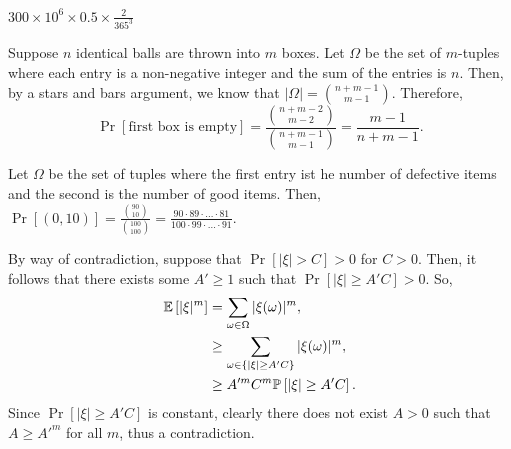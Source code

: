 \begin{problem}{1}
\end{problem}
\begin{solution} 
    $300\times {10}^{6} \times 0.5 \times \frac{2}{365^3}$
\end{solution}
\begin{problem}{2}
\end{problem}
\begin{solution}
    Suppose $n$ identical balls are thrown into $m$ boxes. Let $\Omega$ be the
    set of $m$-tuples where each entry is a non-negative integer and the sum of
    the entries is $n$. Then, by a stars and bars argument, we know that
    $|\Omega| = \binom{n+m-1}{m-1}$. Therefore, 
    \[
      \Pr\left[{\text{first box is empty}}\right] = \frac{\binom{n+m-2}{m-2}}{\binom{n+m-1}{m-1}} = \frac{m-1}{n+m-1}.
    \]
\end{solution}
\begin{problem}{3} 
\end{problem}
\begin{solution}
    Let $\Omega$ be the set of tuples where the first entry ist he number of
    defective items and the second is the number of good items. Then,
    $\Pr\left[{(0,10)}\right] = \frac{\binom{90}{10}}{\binom{100}{100}} =
    \frac{90\cdot 89 \cdot \ldots \cdot 81}{100 \cdot 99 \cdot \ldots \cdot
    91}$.
\end{solution}
\begin{problem}{4}
\end{problem}
\begin{solution}
    By way of contradiction, suppose that $\Pr\left[{|\xi| > C}\right] > 0$ for
    $C > 0$. Then, it follows that there exists some $A' \geq 1$ such that
    $\Pr\left[{|\xi| \geq A'C}\right]> 0$. So, 
    \begin{align*}
        \mathbb{E}\left[|\xi|^m\right] &= \sum_{\omega \in \Omega} |\xi(\omega)|^m, \\
        &\geq \sum_{\omega \in \left\{ |\xi| \geq A'C \right\}} |\xi(\omega)|^m, \\
        &\geq A'^mC^m\mathbb{P}\left[{|\xi| \geq A'C}\right].
    \end{align*}
    Since $\Pr\left[{|\xi| \geq A'C}\right]$ is constant, clearly there does not
    exist $A > 0$ such that $A \geq A'^m$ for all $m$, thus a contradiction.
\end{solution}
\begin{problem}{5}
\end{problem}

